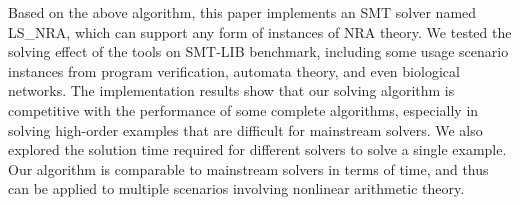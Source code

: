Based on the above algorithm, this paper implements an SMT solver named LS\_NRA, which can support any form of instances of NRA theory. We tested the solving effect of the tools on SMT-LIB benchmark, including some usage scenario instances from program verification, automata theory, and even biological networks. The implementation results show that our solving algorithm is competitive with the performance of some complete algorithms, especially in solving high-order examples that are difficult for mainstream solvers. We also explored the solution time required for different solvers to solve a single example. Our algorithm is comparable to mainstream solvers in terms of time, and thus can be applied to multiple scenarios involving nonlinear arithmetic theory.

